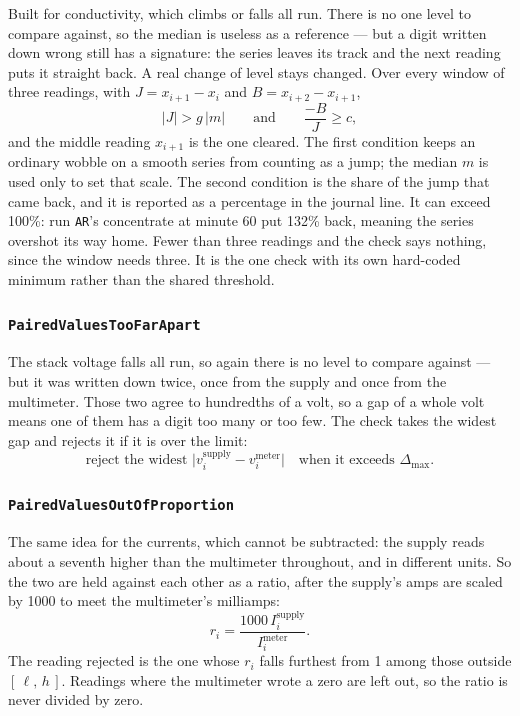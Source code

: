 Built for conductivity, which climbs or falls all run. There is no one level to compare
against, so the median is useless as a reference --- but a digit written down wrong still has a
signature: the series leaves its track and the next reading puts it straight back. A real
change of level stays changed. Over every window of three readings, with
$J = x_{i+1} - x_i$ and $B = x_{i+2} - x_{i+1}$,
\begin{equation}
  \label{eq:jump-and-back}
  \lvert J \rvert > g\,\lvert m \rvert
  \qquad\text{and}\qquad
  \frac{-B}{J} \ge c,
\end{equation}
and the middle reading $x_{i+1}$ is the one cleared. The first condition keeps an ordinary
wobble on a smooth series from counting as a jump; the median $m$ is used only to set that
scale. The second condition is the share of the jump that came back, and it is reported as a
percentage in the journal line. It can exceed 100\%: run \texttt{AR}'s concentrate at minute 60
put 132\% back, meaning the series overshot its way home. Fewer than three readings and the
check says nothing, since the window needs three. It is the one check with its own hard-coded
minimum rather than the shared threshold.

\subsubsection*{\texttt{PairedValuesTooFarApart}}

The stack voltage falls all run, so again there is no level to compare against --- but it was
written down twice, once from the supply and once from the multimeter. Those two agree to
hundredths of a volt, so a gap of a whole volt means one of them has a digit too many or too
few. The check takes the widest gap and rejects it if it is over the limit:
\begin{equation}
  \label{eq:voltage-gap}
  \text{reject the widest } \lvert v^{\text{supply}}_i - v^{\text{meter}}_i\rvert
  \quad\text{when it exceeds } \Delta_{\max}.
\end{equation}

\subsubsection*{\texttt{PairedValuesOutOfProportion}}

The same idea for the currents, which cannot be subtracted: the supply reads about a seventh
higher than the multimeter throughout, and in different units. So the two are held against
each other as a ratio, after the supply's amps are scaled by 1000 to meet the multimeter's
milliamps:
\begin{equation}
  \label{eq:current-ratio}
  r_i = \frac{1000\,I^{\text{supply}}_i}{I^{\text{meter}}_i}.
\end{equation}
The reading rejected is the one whose $r_i$ falls furthest from 1 among those outside
$[\,\ell,\,h\,]$. Readings where the multimeter wrote a zero are left out, so the ratio is
never divided by zero.

